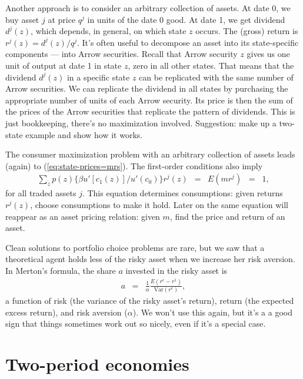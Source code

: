 \documentclass[11pt]{article}
\begin{document}
Another approach is to consider an arbitrary collection of assets.
At date 0, we buy asset $j$ at price $q^j$ in units of the date 0 good.
At date 1, we get dividend $d^j(z)$, which depends, in general,
on which state $z$ occurs.
The (gross) return is $r^j(z) = d^j(z)/q^j$.
It's often useful to decompose an asset into its state-specific components ---
into Arrow securities.
Recall that Arrow security $z$ gives us one unit of output at date 1 in state $z$,
zero in all other states.
That means that the dividend $d^j(z)$ in a specific state $z$ can be replicated with the same number
of Arrow securities.
We can replicate the dividend in all states by purchasing the appropriate number of units
of each Arrow security.
Its price is then the sum of the prices of the Arrow securities that replicate the
pattern of dividends.
This is just bookkeeping, there's no maximization involved.
Suggestion:  make up a two-state example and show how it works.


The consumer maximization problem with an arbitrary  collection of assets
leads (again) to (\ref{eq:state-prices=mrs}).
The first-order conditions also imply
\begin{eqnarray}
    \sum_z p(z) \{ \beta u'[c_1(z)]/u'(c_0) \} r^j(z) &=&
        E(m r^j) \;\;=\;\; 1 ,
        \label{eq:Emr}
\end{eqnarray}
for all traded assets $j$.
This equation determines consumptions:  given returns $r^j(z)$, 
choose consumptions to make it hold.
Later on the same equation will reappear as an asset pricing relation:
given $m$, find the price and return of an asset.


Clean solutions to portfolio choice problems are rare, but we saw that a theoretical agent
holds less of the risky asset when we increase her risk aversion.
In Merton's formula, the share $a$ invested in the risky asset is
\begin{eqnarray*}
    a &=& \frac{1}{\alpha} \frac{E (r^e - r^1)}{\mbox{Var}(r^e)} ,
\end{eqnarray*}
a function of risk (the variance of the risky asset's return),
return (the expected excess return), and risk aversion ($\alpha$).
We won't use this again, but it's a a good sign that things sometimes work
out so nicely, even if it's a special case.



\section*{Two-period economies}
\end{document}

